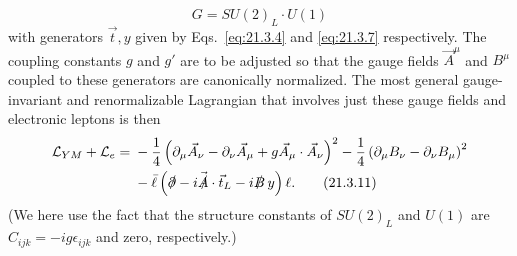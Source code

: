 \begin{equation}
G=SU(2)_L\cdot U(1)
\tag{21.3.10}\label{eq:21.3.10}
\end{equation}
with generators $\vec t,y$ given by Eqs.~\eqref{eq:21.3.4} and \eqref{eq:21.3.7} respectively. The coupling constants $g$ and $g'$ are to be adjusted so that the gauge fields $\vec A^\mu$ and $B^\mu$ coupled to these generators are canonically normalized. The most general gauge-invariant and renormalizable Lagrangian that involves just these gauge fields and electronic leptons is then
\begin{align}
\mathcal{L}_{YM}+\mathcal{L}_e
={}&-\frac{1}{4}
\left(\partial_\mu\vec A_\nu-\partial_\nu\vec A_\mu
+g\vec A_\mu\mathbin{\cdot}\vec A_\nu\right)^2
-\frac{1}{4}\left(\partial_\mu B_\nu-\partial_\nu B_\mu\right)^2
\notag\\
&-\bar\ell\left(\sl{\partial}-i\vec{\sl A}\cdot\vec t_L-i\sl B\,y\right)\ell.
\tag{21.3.11}\label{eq:21.3.11}
\end{align}
(We here use the fact that the structure constants of $SU(2)_L$ and $U(1)$ are $C_{ijk}=-ig\epsilon_{ijk}$ and zero, respectively.)


